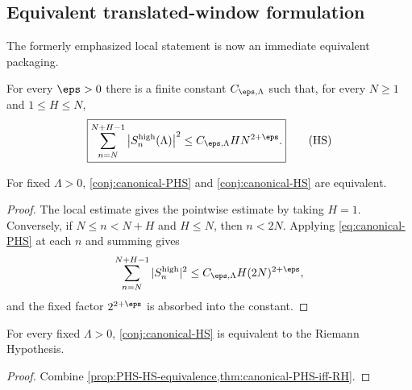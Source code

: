 \subsection{Equivalent translated-window formulation}

The formerly emphasized local statement is now an immediate equivalent packaging.

\begin{conjecture}
\label{conj:canonical-HS}
For every $\eps>0$ there is a finite constant $C_{\eps,\Lambda}$ such that, for every $N\ge1$ and $1\le H\le N$,
\begin{equation}
 \boxed{
 \sum_{n=N}^{N+H-1}
 \left|S_n^{\mathrm{high}}(\Lambda)\right|^2
 \le C_{\eps,\Lambda}HN^{2+\eps}.
 }
 \tag{HS}
 \label{eq:canonical-HS}
\end{equation}
\end{conjecture}

\begin{proposition}
\label{prop:PHS-HS-equivalence}
For fixed $\Lambda>0$, \cref{conj:canonical-PHS} and \cref{conj:canonical-HS} are equivalent.
\end{proposition}

\begin{proof}
The local estimate gives the pointwise estimate by taking $H=1$.  Conversely, if $N\le n<N+H$ and $H\le N$, then $n<2N$.  Applying \cref{eq:canonical-PHS} at each $n$ and summing gives
\[
 \sum_{n=N}^{N+H-1}|S_n^{\mathrm{high}}|^2
 \le C_{\eps,\Lambda}H(2N)^{2+\eps},
\]
and the fixed factor $2^{2+\eps}$ is absorbed into the constant.
\end{proof}

\begin{theorem}
\label{thm:canonical-HS-iff-RH}
For every fixed $\Lambda>0$, \cref{conj:canonical-HS} is equivalent to the Riemann Hypothesis.
\end{theorem}

\begin{proof}
Combine \cref{prop:PHS-HS-equivalence,thm:canonical-PHS-iff-RH}.
\end{proof}
